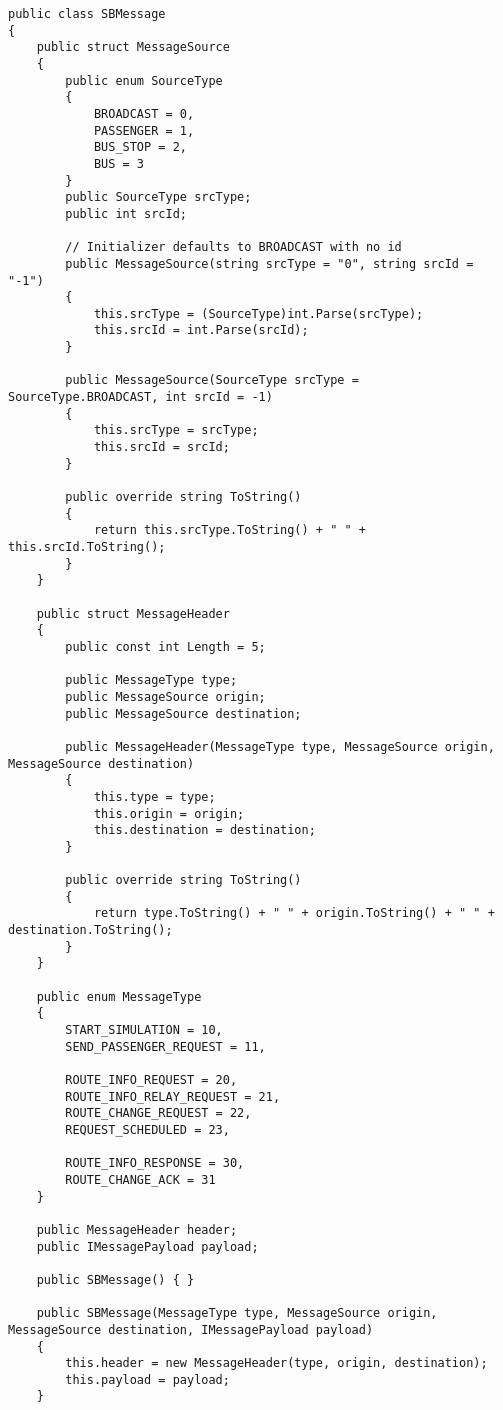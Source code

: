 \documentclass[runningheads]{llncs}
\begin{document}
\begin{lstlisting}[label=lst:sbmessage,caption={Source code for the \lstinline|SBMessage| class}]
public class SBMessage
{
    public struct MessageSource
    {
        public enum SourceType
        {
            BROADCAST = 0,
            PASSENGER = 1,
            BUS_STOP = 2,
            BUS = 3
        }
        public SourceType srcType;
        public int srcId;

        // Initializer defaults to BROADCAST with no id
        public MessageSource(string srcType = "0", string srcId = "-1")
        {
            this.srcType = (SourceType)int.Parse(srcType);
            this.srcId = int.Parse(srcId);
        }

        public MessageSource(SourceType srcType = SourceType.BROADCAST, int srcId = -1)
        {
            this.srcType = srcType;
            this.srcId = srcId;
        }

        public override string ToString()
        {
            return this.srcType.ToString() + " " + this.srcId.ToString();
        }
    }

    public struct MessageHeader
    {
        public const int Length = 5;

        public MessageType type;
        public MessageSource origin;
        public MessageSource destination;

        public MessageHeader(MessageType type, MessageSource origin, MessageSource destination)
        {
            this.type = type;
            this.origin = origin;
            this.destination = destination;
        }

        public override string ToString()
        {
            return type.ToString() + " " + origin.ToString() + " " + destination.ToString();
        }
    }

    public enum MessageType
    {
        START_SIMULATION = 10,
        SEND_PASSENGER_REQUEST = 11,

        ROUTE_INFO_REQUEST = 20,
        ROUTE_INFO_RELAY_REQUEST = 21,
        ROUTE_CHANGE_REQUEST = 22,
        REQUEST_SCHEDULED = 23,

        ROUTE_INFO_RESPONSE = 30,
        ROUTE_CHANGE_ACK = 31
    }

    public MessageHeader header;
    public IMessagePayload payload;

    public SBMessage() { }

    public SBMessage(MessageType type, MessageSource origin, MessageSource destination, IMessagePayload payload)
    {
        this.header = new MessageHeader(type, origin, destination);
        this.payload = payload;
    }


\end{lstlisting}
\end{document}
